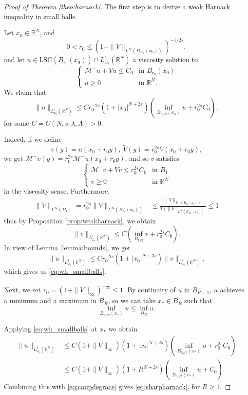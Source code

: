 \documentclass[a4paper,11pt]{article}
\newcommand{\R}{\mathbb{R}}
\newcommand{\M}{\mathcal{M}}
\newcommand{\lsc}{\text{LSC}}
\newcommand{\Lomega}{L_{\omega_s}^1(\R^N)}
\begin{document}
\begin{proof}[Proof of Theorem \ref{theo:harnack}]
	The first step is to derive a weak Harnack inequality in small balls.

Let $x_0 \in \R^N$, and
\begin{equation}
\label{eq:r0}
0 < r_0 \leq (1 + \|V\|_{L^{\infty}(B_{2r_0}(x_0))})^{-1/2s},
\end{equation}
and let $u \in \lsc(B_{r_0}(x_0)) \cap \Lomega$ a viscosity solution to 
\[\begin{cases}
\M^-u + Vu \leq C_0 & \text{in }B_{r_0}(x_0) \\
u\geq 0 & \text{in } \R^N. 
\end{cases}\]
We claim that
\begin{equation}
\label{eq:wh_smallballs}
\|u\|_{\Lomega} \leq C r_0^{-2s} (1+|x_0|^{N+2s}) \left(\inf_{B_{r_0/2} (x_0)}u + r_0^{2s}C_0 \right),
\end{equation}
for some $C=C(N,s,\lambda,\Lambda)>0$.

Indeed, if we define 
\begin{equation}
\label{eq:v}
v(y) = u(x_0 + r_0y),~\tilde{V}(y) = r_0^{2s}V(x_0+r_0 y),
\end{equation} 
we get $\M^-v(y) = r_0^{2s}\M^-u(x_0 +r_0y)$, and so $v$ satisfies  
\[\begin{cases}
\M^-v + \tilde{V}v \leq r_0^{2s}C_0 & \text{in }B_1 \\
v\geq 0 & \text{in } \R^N
\end{cases}\]
in the viscosity sense. Furthermore, 
\begin{align*}
\|\tilde{V}\|_{L^{\infty}(B_1)} =r_0^{2s} \|V\|_{L^{\infty}(B_{r_0}(x_0))} &\leq \frac{\|V\|_{L^{\infty}(B_{r_0}(x_0))}}{1 + \|V\|_{L^{\infty}(B_{2r_0}(x_0))}} \leq 1
\end{align*}
thus by Proposition \ref{prop:weakharnack}, we obtain 
\[\|v\|_{\Lomega}\leq C(\inf_{B_{1/2}}v + r_0^{2s}C_0). \]
In view of Lemma \ref{lemma:bounds}, we get 
\[\|u\|_{\Lomega} \leq C r_0^{-2s} (1 + |x_0|^{N+2s})   \|v\|_{\Lomega} ,
 \]
which gives us \eqref{eq:wh_smallballs}.

\smallskip

Next, we set $r_0 = (1 + \|V\|_{\infty})^{-\frac{1}{2s}} \leq 1$. 
By continuity of $u$ in $B_{R+1}$, $u$ achieves a minimum and a maximum in $\overline{B}_R$, so we can take $x_*\in {B}_R$ such that
\begin{equation}
\label{eq:coupdegrace}
\inf_{B_{r_0/2}(x_*)}u \leq  \inf_{B_R}u .
\end{equation}

Applying \eqref{eq:wh_smallballs} at $x_*$ we obtain
\begin{align*}
\|u\|_{\Lomega} & \leq C(1 + \|V\|_{\infty}) (1+|x_*|^{N+2s})\left(\inf_{B_{r_0/2} (x_*)}u  + r_0^{2s}C_0\right) \\
&  \leq C(1 + \|V\|_{\infty})  (1 + R^{N+2s})\left(\inf_{B_{r_0/2} (x_*)}u + C_0\right).
\end{align*}
Combining this with \eqref{eq:coupdegrace} gives \eqref{eq:sharpharnack}, for  $R\geq 1$.
\end{proof}
\end{document}
